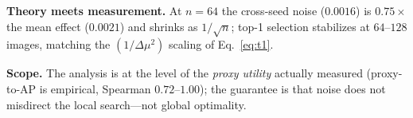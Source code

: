 \smallskip
\noindent\textbf{Theory meets measurement.}
At $n{=}64$ the cross-seed noise ($0.0016$) is $0.75\times$ the mean
effect ($0.0021$) and shrinks as $1/\sqrt n$; top-1 selection
stabilizes at $64$--$128$ images, matching the $(1/\Delta\mu^{2})$
scaling of Eq.~\eqref{eq:t1}.

\smallskip
\noindent\textbf{Scope.}
The analysis is at the level of the \emph{proxy utility} actually
measured (proxy-to-AP is empirical, Spearman $0.72$--$1.00$); the
guarantee is that noise does not misdirect the local search---not
global optimality.
